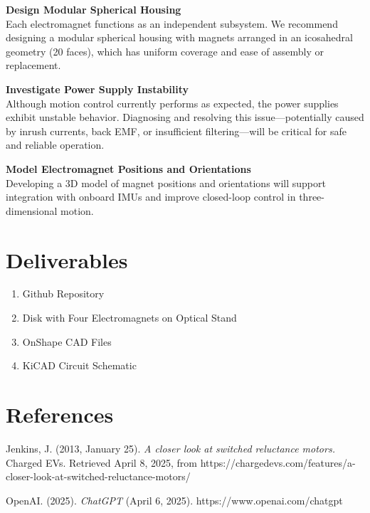 \documentclass[11pt]{article} %
\begin{document}
\textbf{Design Modular Spherical Housing}\\
Each electromagnet functions as an independent subsystem. We recommend designing a modular spherical housing with magnets arranged in an icosahedral geometry (20 faces), which has uniform coverage and ease of assembly or replacement.

\textbf{Investigate Power Supply Instability}\\
Although motion control currently performs as expected, the power supplies exhibit unstable behavior. Diagnosing and resolving this issue—potentially caused by inrush currents, back EMF, or insufficient filtering—will be critical for safe and reliable operation.

\textbf{Model Electromagnet Positions and Orientations}\\
 Developing a 3D model of magnet positions and orientations will support integration with onboard IMUs and improve closed-loop control in three-dimensional motion.

\section{Deliverables}
\begin{enumerate}
    \item Github Repository
    \item Disk with Four Electromagnets on Optical Stand
    \item OnShape CAD Files
    \item KiCAD Circuit Schematic
\end{enumerate}

\section{References}
Jenkins, J. (2013, January 25). \textit{A closer look at switched reluctance motors.} Charged EVs. Retrieved April 8, 2025, from https://chargedevs.com/features/a-closer-look-at-switched-reluctance-motors/

OpenAI. (2025). \textit{ChatGPT} (April 6, 2025). https://www.openai.com/chatgpt
\newpage

\appendix
\setcounter{section}{0}  %
\end{document}
